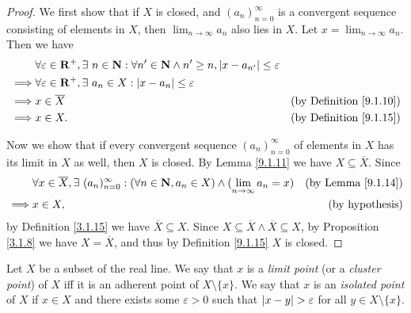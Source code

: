 \begin{proof}
    We first show that if \(X\) is closed, and \((a_n)_{n = 0}^\infty\) is a convergent sequence consisting of elements in \(X\), then \(\lim_{n \to \infty} a_n\) also lies in \(X\).
    Let \(x = \lim_{n \to \infty} a_n\).
    Then we have
    \begin{align*}
                 & \forall \varepsilon \in \mathbf{R}^+, \exists\ n \in \mathbf{N} : \forall n' \in \mathbf{N} \land n' \geq n, \left\lvert x - a_{n'}\right\rvert \leq \varepsilon                                       \\
        \implies & \forall \varepsilon \in \mathbf{R}^+, \exists\ a_n \in X : \left\lvert x - a_n\right\rvert \leq \varepsilon                                                                            \\
        \implies & x \in \overline{X}                                                                                                     & \text{(by Definition \ref{9.1.10})} \\
        \implies & x \in X.                                                                                                               & \text{(by Definition \ref{9.1.15})}
    \end{align*}

    Now we show that if every convergent sequence \((a_n)_{n = 0}^\infty\) of elements in \(X\) has its limit in \(X\) as well, then \(X\) is closed.
    By Lemma \ref{9.1.11} we have \(X \subseteq \overline{X}\).
    Since
    \begin{align*}
                 & \forall x \in \overline{X}, \exists\ (a_n)_{n = 0}^\infty : (\forall n \in \mathbf{N}, a_n \in X) \land (\lim_{n \to \infty} a_n = x) & \text{(by Lemma \ref{9.1.14})} \\
        \implies & x \in X,                                                                                                                      & \text{(by hypothesis)}
    \end{align*}
    by Definition \ref{3.1.15} we have \(\overline{X} \subseteq X\).
    Since \(X \subseteq \overline{X} \land \overline{X} \subseteq X\), by Proposition \ref{3.1.8} we have \(X = \overline{X}\), and thus by Definition \ref{9.1.15} \(X\) is closed.
\end{proof}

\begin{definition}\label{9.1.18}
    Let \(X\) be a subset of the real line.
    We say that \(x\) is a \emph{limit point} (or a \emph{cluster point}) of \(X\) iff it is an adherent point of \(X \setminus \{x\}\).
    We say that \(x\) is an \emph{isolated point} of \(X\) if \(x \in X\) and there exists some \(\varepsilon > 0\) such that \(\left\lvert x - y\right\rvert > \varepsilon\) for all \(y \in X \setminus \{x\}\).
\end{definition}

